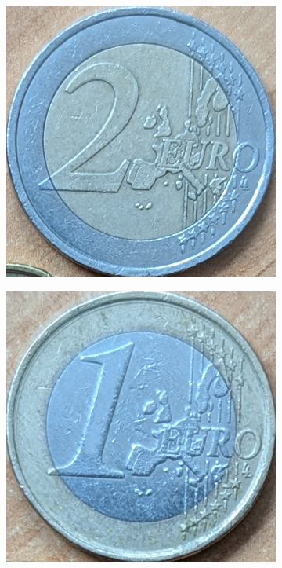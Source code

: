 \begin{figure}[ht]
    \centering
    \begin{subfigure}{0.23\textwidth}
        \includegraphics[width=\linewidth]{../CoinFinder/templates_2/Euro2.png}
    \end{subfigure}
    \begin{subfigure}{0.23\textwidth}
        \includegraphics[width=\linewidth]{../CoinFinder/templates_2/Euro1.png}

\end{subfigure}
\end{figure}
